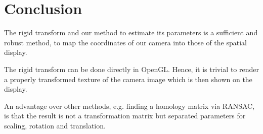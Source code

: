 \section{Conclusion}
The rigid transform and our method to estimate its parameters is a
sufficient and robust method, to map the coordinates of our camera
into those of the spatial display.

The rigid transform can be done directly in OpenGL. Hence, it is
trivial to render a properly transformed texture of the camera
image which is then shown on the display.

An advantage over other methods, e.g. finding a homology matrix via
RANSAC, is that the result is not a transformation matrix but
separated parameters for scaling, rotation and translation. 